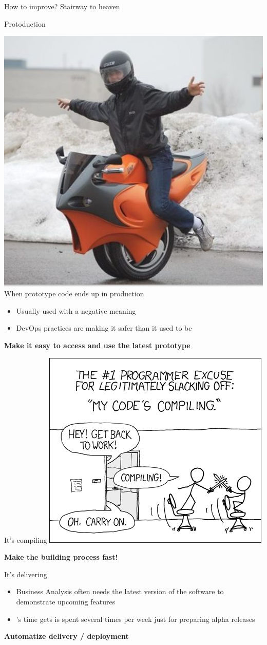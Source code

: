 \documentclass[presentation]{beamer}
\begin{document}
\begin{frame}{How to improve? Stairway to heaven}
	\begin{block}{Protoduction \cite{jargon}}
		\begin{center}
			\includegraphics[width=.25\textwidth]{images/protoduction} \\
			When prototype code ends up in production
		\end{center}
		\begin{itemize}
			\item Usually used with a negative meaning
			\item DevOps practices are making it safer than it used to be
		\end{itemize}
		\textbf{Make it easy to access and use the latest prototype}
	\end{block}
	\begin{block}{It's compiling \cite{xkcd303}}
		\centering
		\includegraphics[width=.55\textwidth]{images/compiling}

		\textbf{Make the building process fast!}
	\end{block}
	\begin{block}{It's delivering}
		\begin{itemize}
			\item Business Analysis often needs the latest version of the software to demonstrate upcoming features
			\item \baddev{}'s time gets is spent several times per week just for preparing alpha releases
		\end{itemize}
		\textbf{Automatize delivery / deployment}
	\end{block}
\end{frame}
\end{document}
